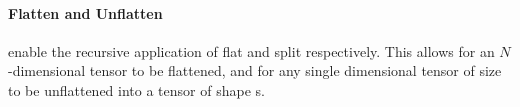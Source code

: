 \paragraph{Flatten and Unflatten} enable the recursive application of flat and 
split respectively.
This allows for an $N$-dimensional tensor to be flattened, and for any single dimensional
tensor of size  to be unflattened into a tensor of shape s.
\begin{code}%
%
\>[2]\AgdaSpace{}%
\AgdaSymbol{:}\AgdaSpace{}%
\AgdaSpace{}%
\AgdaSpace{}%
\AgdaSymbol{(}\AgdaSpace{}%
\AgdaSymbol{(}\AgdaSpace{}%
\AgdaSymbol{))}\<%
\\
%
\>[2]\AgdaSpace{}%
\AgdaSymbol{\{}\AgdaSpace{}%
%
\>[11]\AgdaSymbol{\}}\AgdaSpace{}%
\AgdaSymbol{=}\AgdaSpace{}%
\<%
\\
%
\>[2]\AgdaSpace{}%
\AgdaSymbol{\{}\AgdaSpace{}%
\AgdaSpace{}%
\AgdaSymbol{\}}\AgdaSpace{}%
\AgdaSymbol{=}\AgdaSpace{}%
\AgdaSpace{}%
\AgdaSpace{}%
\AgdaSpace{}%
\AgdaSpace{}%
\<%
\\
%
\\[\AgdaEmptyExtraSkip]%
%
\>[2]\<%
\\
%
\>[2]\AgdaSpace{}%
\AgdaSymbol{:}\AgdaSpace{}%
\AgdaSpace{}%
\AgdaSymbol{(}\AgdaSpace{}%
\AgdaSymbol{(}\AgdaSpace{}%
\AgdaSymbol{))}\AgdaSpace{}%
\<%
\\
%
\>[2]\AgdaSpace{}%
\AgdaSymbol{=}\AgdaSpace{}%
\AgdaSpace{}%
\<%
\end{code}

